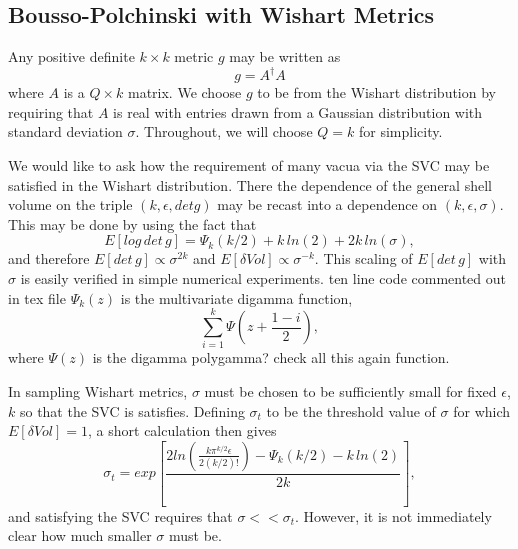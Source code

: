 \documentclass[a4paper,11pt]{article}
\newcommand{\jh}[1]{{\color{blue}  #1}}
\begin{document}
\subsection{Bousso-Polchinski with Wishart Metrics}
Any positive definite $k\times k$ metric $g$ may be written as
\begin{equation}
g = A^\dagger A
\end{equation}
where $A$ is a $Q\times k$ matrix. We choose $g$ to be from the
Wishart distribution by requiring that $A$ is real with entries drawn from a Gaussian distribution with standard deviation $\sigma$. Throughout, we
will choose $Q=k$ for simplicity.

We would like to ask how the requirement of many vacua via the SVC
may be satisfied in the Wishart distribution. There the dependence of the
general shell volume on the triple $(k,\epsilon,det g)$ may be recast into
a dependence on $(k,\epsilon,\sigma)$. This may be done by using the
fact that
\begin{equation}
E[log\, det \, g] = \Psi_k(k/2) + k \,ln(2) + 2 k \,ln(\sigma),
\end{equation}
and therefore $E[det \, g]\propto \sigma^{2k}$ and $
E[\delta Vol] \propto \sigma^{-k}$.  This scaling of $E[det \, g]$ with
$\sigma$ is easily verified in simple numerical experiments. 
\jh{ten line code commented out in tex file}
$\Psi_k(z)$ is the multivariate digamma function,
\begin{equation}
\sum_{i=1}^k \Psi\left(z+\frac{1-i}{2}\right),
\end{equation}
where $\Psi(z)$ is the digamma \jh{polygamma? check all this again}
function.


In sampling Wishart metrics, $\sigma$ must be chosen to be sufficiently
small for fixed $\epsilon$, $k$ so that the SVC is satisfies.
Defining $\sigma_t$ to be the threshold value of $\sigma$ for which 
$E[\delta Vol]=1$,
a short calculation then gives
\begin{equation}
\sigma_t = exp\left[\frac{2 ln\left(\frac{k \pi^{k/2} \epsilon}{2 (k/2)!}\right)-\Psi_k(k/2)-k\, ln(2)}{2k}\right],
\end{equation}
and satisfying the SVC requires that $\sigma << \sigma_t$. However,
it is not immediately clear how much smaller $\sigma$ must be.
\end{document}
